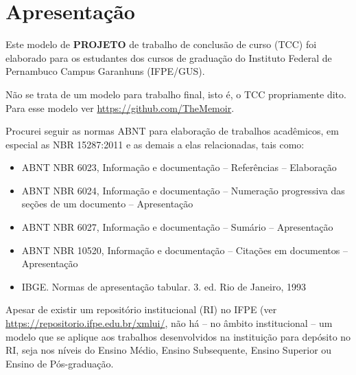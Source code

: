 \documentclass[a4paper,12pt,oneside]{memoir}
\begin{document}
\frontmatter{
    \begin{titlingpage}
    
    \end{titlingpage}
\tableofcontents*
\thispagestyle{empty}
\newpage\listoffigures*
\thispagestyle{empty}
\newpage\listoftables*
\thispagestyle{empty}
}
\savepagenumber
\mainmatter
\restorepagenumber
\pagestyle{simple}
\OnehalfSpacing

\chapter*{Apresentação}

Este modelo de \textbf{PROJETO} de trabalho de conclusão de curso (TCC) foi elaborado para os estudantes dos cursos de graduação do Instituto Federal de Pernambuco Campus Garanhuns (IFPE/GUS).

Não se trata de um modelo para trabalho final, isto é, o TCC propriamente dito. Para esse modelo ver \url{https://github.com/TheMemoir}.

Procurei seguir as normas ABNT para elaboração de trabalhos acadêmicos, em especial as NBR 15287:2011 e as demais a elas relacionadas, tais como:

\begin{itemize}
\itemsep0em
    \item ABNT NBR 6023, Informação e documentação – Referências – Elaboração
    \item ABNT NBR 6024, Informação e documentação – Numeração progressiva das seções de um
    documento – Apresentação
    \item ABNT NBR 6027, Informação e documentação – Sumário – Apresentação
    \item ABNT NBR 10520, Informação e documentação – Citações em documentos – Apresentação
    \item IBGE. Normas de apresentação tabular. 3. ed. Rio de Janeiro, 1993
\end{itemize}

Apesar de existir um repositório institucional (RI) no IFPE (ver \url{https://repositorio.ifpe.edu.br/xmlui/}, não há -- no âmbito institucional -- um modelo que se aplique aos trabalhos desenvolvidos na instituição para depósito no RI, seja nos níveis do Ensino Médio, Ensino Subsequente, Ensino Superior ou Ensino de Pós-graduação.
\end{document}
